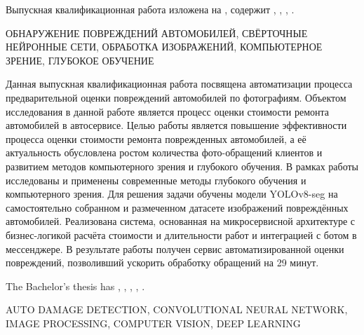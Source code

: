 

Выпускная квалификационная работа изложена на  
,
содержит
,
,
, 
.
\bigskip

\noindent
ОБНАРУЖЕНИЕ ПОВРЕЖДЕНИЙ АВТОМОБИЛЕЙ, СВЁРТОЧНЫЕ НЕЙРОННЫЕ СЕТИ, ОБРАБОТКА ИЗОБРАЖЕНИЙ,
КОМПЬЮТЕРНОЕ ЗРЕНИЕ, ГЛУБОКОЕ ОБУЧЕНИЕ
\bigskip

Данная выпускная квалификационная работа посвящена автоматизации процесса предварительной оценки повреждений автомобилей по фотографиям. Объектом исследования в данной работе является процесс оценки стоимости ремонта автомобилей в автосервисе. Целью работы является повышение эффективности процесса оценки стоимости ремонта поврежденных автомобилей, а её актуальность обусловлена ростом количества фото-обращений клиентов и развитием методов компьютерного зрения и глубокого обучения.
В рамках работы исследованы и применены современные методы глубокого обучения и компьютерного зрения. Для решения задачи обучены модели YOLOv8-seg на самостоятельно собранном и размеченном датасете изображений повреждённых автомобилей. Реализована система, основанная на микросервисной архитектуре с бизнес-логикой расчёта стоимости и длительности работ и интеграцией с ботом в мессенджере. В результате работы получен сервис автоматизированной оценки повреждений, позволивший ускорить обработку обращений на 29 минут.


\clearpage
{}


The Bachelor's thesis has
,
,
,
, 
.
\bigskip

\noindent
AUTO DAMAGE DETECTION, CONVOLUTIONAL NEURAL NETWORK, IMAGE PROCESSING, COMPUTER VISION, DEEP LEARNING
\bigskip


